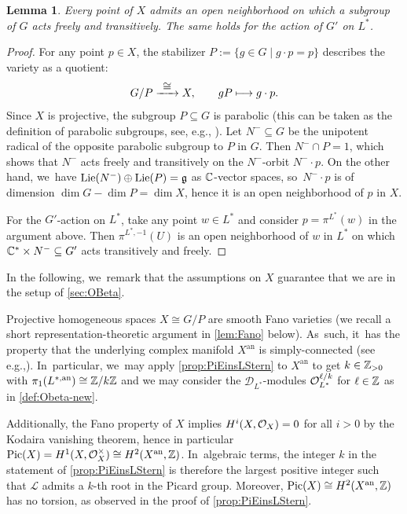 \documentclass[11pt]{article}
\newcommand{\eg}{e.g.,\xspace}
\newcommand\mto{\mathchoice{\longmapsto}{\mapsto}{\mapsto}{\mapsto}}
\newcommand{\To}[1]{\mathchoice{\xrightarrow{\textstyle\kern4pt#1\kern3pt}}{\xrightarrow{\,#1\,}}{}{}}
\newtheorem{lem}[thm]{Lemma}
\newcommand{\Ell}{\mathscr{L}}
\newcommand{\frg}{\mathfrak{g}}
\DeclareMathOperator{\Lie}{\textup{Lie}}
\DeclareMathOperator{\Pic}{Pic}
\begin{document}
\begin{lem}\label{lem:transitCond}
Every point of $X$ admits an open neighborhood on which a subgroup of $G$ acts freely and transitively. The same holds for the action of $G'$ on $L^*$.
\end{lem}

\begin{proof}
For any point $p \in X$, the stabilizer $P := \{g \in G \mid g \cdot p = p\}$ describes the variety as a quotient:
\[
G/P \To{\cong} X, \qquad gP \mto g \cdot p.
\]
Since $X$ is projective, the subgroup $P \subseteq G$ is parabolic (this can be taken as the definition of parabolic subgroups, see, e.g., \cite[\S21.3]{Hum75}). Let $N^{-} \subseteq G$ be the unipotent radical of the opposite parabolic subgroup to $P$ in $G$. Then $N^{-} \cap P = 1$, which shows that $N^{-}$ acts freely and transitively on the $N^{-}$-orbit $N^{-} \cdot p$. On the other hand, we~have $\Lie(N^{-}) \oplus \Lie(P) = \frg$ as ${\mathbb C}$-vector spaces, so~$N^{-} \cdot p$ is of dimension $\dim G - \dim P = \dim X$, hence it is an open neighborhood of $p$ in $X$.

For the $G'$-action on $L^*$, take any point $w \in L^*$ and consider $p = \pi^{L^*}(w)$ in the argument above. Then $\pi^{L^*,-1}(U)$ is an open neighborhood of $w$ in $L^*$ on which ${\mathbb C}^* \times N^{-} \subseteq G'$ acts transitively and freely.
\end{proof}

In the following, we~remark that the assumptions on $X$ guarantee that we are in the setup of \cref{sec:OBeta}.

\begin{rmk}
Projective homogeneous spaces $X \cong G/P$ are smooth Fano varieties (we recall a short representation-theoretic argument in \cref{lem:Fano} below). As~such, it~has the property that the underlying complex manifold $X^{\mathrm{an}}$ is simply-connected (see \eg \cite[Cor.\,4.29]{Debarre-2001}). In~particular, we~may apply \cref{prop:PiEinsLStern} to $X^{\mathrm{an}}$ to get $k \in {\mathbb Z}_{>0}$ with $\pi_1(L^{*,\mathrm{an}}) \cong {\mathbb Z}/k{\mathbb Z}$ and we may consider the $\mathscr D_{L^*}$\nobreakdash-mod\-ules $\mathcal{O}_{L^*}^{\ell/k}$ for $\ell \in {\mathbb Z}$ as in \cref{def:Obeta-new}.

Additionally, the Fano property of $X$ implies $H^i(X,\mathcal{O}_X) = 0$ for all $i > 0$ by the Kodaira vanishing theorem, hence in particular $\Pic(X) = H^1(X,\O_X^\times) \cong H^2(X^{\mathrm{an}},\Z)$. In~algebraic terms, the integer $k$ in the statement of \cref{prop:PiEinsLStern} is therefore the largest positive integer such that $\Ell$ admits a $k$-th root in the Picard group. Moreover, $\Pic(X) \cong H^2(X^{\mathrm{an}},\Z)$ has no torsion, as observed in the proof of \cref{prop:PiEinsLStern}.
\end{rmk}
\end{document}
